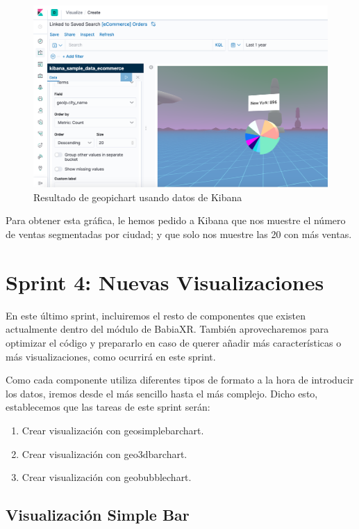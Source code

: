 \documentclass[a4paper, 12pt]{book}
\begin{document}
\begin{figure}[H]
  \centering
  \includegraphics[width=12cm, keepaspectratio]{img/development/pie-con-data.png}
  \caption{Resultado de geopichart usando datos de Kibana}
  \label{fig:piecondata}
\end{figure}

Para obtener esta gráfica, le hemos pedido a Kibana que nos muestre el número de ventas segmentadas por ciudad; y que solo nos muestre las 20 con más ventas.


\section{Sprint 4: Nuevas Visualizaciones }
\label{sec:sprint4}

En este último sprint, incluiremos el resto de componentes que existen actualmente dentro del módulo de BabiaXR. También aprovecharemos para optimizar el código y prepararlo en caso de querer añadir más características o más visualizaciones, como ocurrirá en este sprint.

Como cada componente utiliza diferentes tipos de formato a la hora de introducir los datos, iremos desde el más sencillo hasta el más complejo. Dicho esto, establecemos que las tareas de este sprint serán:

\begin{enumerate}
    \item Crear visualización con geosimplebarchart.
    \item Crear visualización con geo3dbarchart.
    \item Crear visualización con geobubblechart.
\end{enumerate}

\subsection{Visualización Simple Bar}
\label{sec:simplebar}
\end{document}
